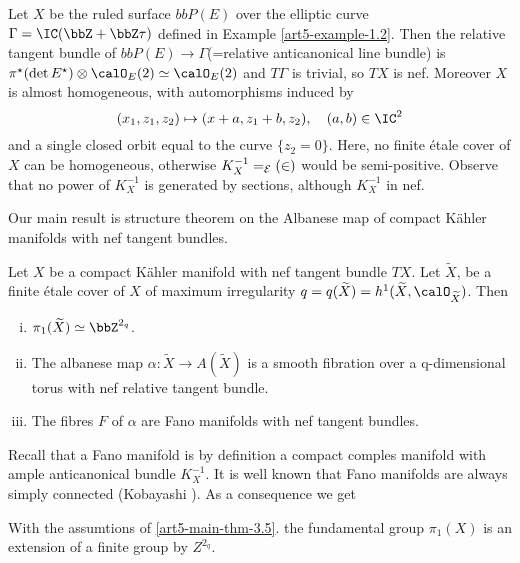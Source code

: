 \begin{example}\label{art5-example-3.4}
Let $X$ be the ruled surface $bbP(E)$ over the elliptic curve $\Gamma = \IC(\bbZ + \bbZ\tau)$ defined in Example
\ref{art5-example-1.2}. Then the relative tangent bundle of $bbP(E)\rightarrow \Gamma$(=relative anticanonical line bundle) is $\pi^{\star}(\det E^{\star})\otimes \calO_{E}(2) \simeq \calO_{E}(2)$ and $T\Gamma$ is trivial, so $TX$ is nef. Moreover $X$ is almost homogeneous, with automorphisms induced by
$$
(x_{1}, z_{1}, z_{2}) \mapsto (x+a, z_{1}+b, z_{2}),\quad (a,b) \in \IC^{2}
$$ 
and a single closed orbit equal to the curve $\{z_{2}=0\}$. Here, no finite \'etale cover of $X$ can be homogeneous, otherwise $K_{X}^{-1} = \cal_{E}(2)$ would be semi-positive. Observe that no power of $K_{X}^{-1}$ is generated by sections, although $K_{X}^{-1}$ in nef.
\end{example}

Our main result is structure theorem on the Albanese map of compact K\"ahler manifolds with nef tangent bundles.

\begin{main theorem}\label{art5-main-thm-3.5}
Let $X$ be a compact K\"ahler manifold with nef tangent bundle $TX$. Let $\widetilde{X}$, be a finite \'etale cover of $X$ of maximum irregularity $q=q(\widetilde{X}) = h^{1}(\widetilde{X}, \calO_{\widetilde{X}})$. Then
    \begin{enumerate}[(i)]
        \item $\pi_{1}(\widetilde{X}) \simeq \bbZ^{2_{q}}$.\label{art5-enum_(i)}
        \item The albanese map $\alpha : \widetilde{X} \rightarrow A(\widetilde{X})$ is a smooth fibration over a q-dimensional torus with nef relative tangent bundle. \label{art5-enum_(ii)}
        \item The fibres $F$ of $\alpha$ are Fano manifolds with nef tangent bundles.\label{art5-enum_(iii)}
    \end{enumerate}
\end{main theorem}

Recall that  a Fano manifold is by definition a compact comples manifold with ample anticanonical bundle $K_{X}^{-1}$. It is well known that Fano manifolds are always simply connected (Kobayashi \cite{art5-keyKo61}). As a consequence we get 

\begin{coro}\label{art5-coro-3.6}
With the assumtions of \ref{art5-main-thm-3.5}. the fundamental group $\pi_{1}(X)$ is an extension of a finite group by $Z^{2_{q}}$.
\end{coro}

